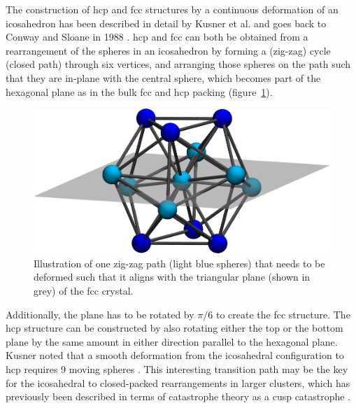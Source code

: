 The construction of hcp and fcc structures by a continuous deformation of an
icosahedron has been described in detail by Kusner et al.
\autocite{Kusner_ConfigurationSpacesEqual_2018} and goes back to Conway and
Sloane in 1988 \autocite{Conway_SpherePackingsLattices_1999}. \ac{hcp} and
\ac{fcc} can both be obtained from a rearrangement of the spheres in an
icosahedron by forming a (zig-zag) cycle (closed path) through six vertices, and
arranging those spheres on the path such that they are in-plane with the central
sphere, which becomes part of the hexagonal plane as in the bulk \ac{fcc} and
\ac{hcp} packing (figure~\ref{fig:ico-fcc-trans}).
%
\begin{figure}[htb]
    \centering
    \includegraphics[width=.8\columnwidth]{gregory-newton/plane.png}
    \caption{Illustration of one zig-zag path (light blue spheres) that needs
    to be deformed such that it aligns with the triangular plane (shown in
    grey) of the fcc crystal.}
    \label{fig:ico-fcc-trans}
\end{figure}
%
Additionally, the plane has to be rotated by $\pi/6$ to create the \ac{fcc}
structure. The \ac{hcp} structure can be constructed by also rotating either the
top or the bottom plane by the same amount in either direction parallel to the
hexagonal plane. Kusner noted that a smooth deformation from the icosahedral
configuration to hcp requires 9 moving spheres
\autocite{Kusner_ConfigurationSpacesEqual_2018}. This interesting transition
path may be the key for the icosahedral to closed-packed rearrangements in
larger clusters, which has previously been described in terms of catastrophe
theory as a cusp catastrophe \autocite{Wales_MicroscopicBasisGlobal_2001}. 

